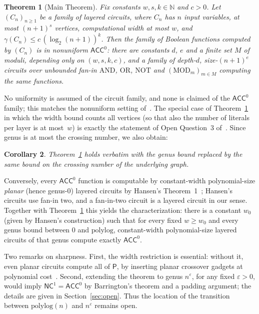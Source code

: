 \documentclass[11pt]{article}
\newtheorem{theorem}{Theorem}[section]
\newtheorem{corollary}[theorem]{Corollary}
\theoremstyle{definition}
\theoremstyle{remark}
\newcommand{\ACC}{\mathsf{ACC}^0}
\newcommand{\NC}{\mathsf{NC}^1}
\newcommand{\genus}{\gamma}
\begin{document}
\begin{theorem}[Main Theorem]\label{thm:main}
Fix constants $w,s,k\in\mathbb{N}$ and $c>0$. Let $(C_n)_{n\ge 1}$ be a family of
layered circuits, where $C_n$ has $n$ input variables, at most $(n+1)^{s}$ vertices,
computational width at most $w$, and $\genus(C_n)\le c\,(\log_2 (n+1))^{k}$.
Then the family of Boolean functions computed by $(C_n)$ is in nonuniform $\ACC$:
there are constants $d$, $e$ and a finite set $M$ of moduli, depending only on
$(w,s,k,c)$, and a family of depth-$d$, size-$(n+1)^{e}$ circuits over unbounded
fan-in $\mathrm{AND}$, $\mathrm{OR}$, $\mathrm{NOT}$ and $(\mathrm{MOD}_m)_{m\in M}$
computing the same functions.
\end{theorem}

No uniformity is assumed of the circuit family, and none is claimed of the $\ACC$
family; this matches the nonuniform setting of~\cite{ADR05,Allender23}. The
special case of Theorem~\ref{thm:main} in which the width bound counts all vertices
(so that also the number of literals per layer is at most~$w$) is exactly the
statement of Open Question~3 of~\cite{Allender23}. Since genus is at most the
crossing number, we also obtain:

\begin{corollary}\label{cor:crossing}
Theorem~\ref{thm:main} holds verbatim with the genus bound replaced by the same bound
on the crossing number of the underlying graph.
\end{corollary}

Conversely, every $\ACC$ function is computable by constant-width polynomial-size
\emph{planar} (hence genus-$0$) layered circuits by Hansen's
Theorem~1~\cite{Hansen03}; Hansen's circuits use fan-in two, and a fan-in-two circuit
is a layered circuit in our sense. Together with Theorem~\ref{thm:main} this yields
the characterization: there is a constant $w_0$ (given by Hansen's construction) such that for every fixed $w\ge w_0$ and every genus bound
between $0$ and $\mathrm{polylog}$, constant-width polynomial-size layered circuits of
that genus compute exactly $\ACC$.

Two remarks on sharpness. First, the width restriction is essential: without it,
even planar circuits compute all of $\mathsf{P}$, by inserting planar crossover
gadgets at polynomial cost~\cite{Goldschlager77}. Second, extending the theorem to
genus $n^{\varepsilon}$, for any fixed $\varepsilon>0$, would imply
$\NC=\ACC$ by Barrington's theorem and a padding argument; the details are given
in Section~\ref{sec:open}. Thus the location of the transition between
$\mathrm{polylog}(n)$ and $n^{\varepsilon}$ remains open.
\end{document}
